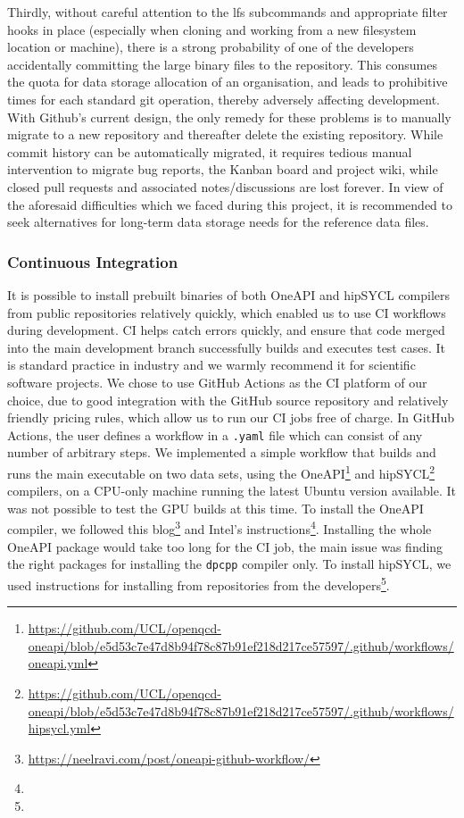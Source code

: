 \documentclass[../main]{subfiles}
\begin{document}
Thirdly, without careful attention to the lfs subcommands and appropriate filter hooks in place (especially when cloning and working from a new filesystem location or machine), there is a strong probability of one of the developers accidentally committing the large binary files to the repository.
This consumes the quota for data storage allocation of an organisation, and leads to prohibitive times for each standard git operation, thereby adversely affecting development.
With Github's current design, the only remedy for these problems is to manually migrate to a new repository and thereafter delete the existing repository.
While commit history can be automatically migrated, it requires tedious manual intervention to migrate bug reports, the Kanban board and project wiki, while closed pull requests and associated notes/discussions are lost forever.
In view of the aforesaid difficulties which we faced during this project, it is recommended to seek alternatives for long-term data storage needs for the reference data files.



\subsubsection{Continuous Integration}

It is possible to install prebuilt binaries of both OneAPI and hipSYCL compilers from public repositories relatively quickly, which enabled us to use CI workflows during development.
CI helps catch errors quickly, and ensure that code merged into the main development branch successfully builds and executes test cases.
It is standard practice in industry and we warmly recommend it for scientific software projects.
We chose to use GitHub Actions as the CI platform of our choice, due to good integration with the GitHub source repository and relatively friendly pricing rules, which allow us to run our CI jobs free of charge.
In GitHub Actions, the user defines a workflow in a \verb #.yaml# file which can consist of any number of arbitrary steps.
We implemented a simple workflow that builds and runs the main executable on two data sets, using the OneAPI\footnote{\url{https://github.com/UCL/openqcd-oneapi/blob/e5d53c7e47d8b94f78c87b91ef218d217ce57597/.github/workflows/oneapi.yml}} and hipSYCL\footnote{\url{https://github.com/UCL/openqcd-oneapi/blob/e5d53c7e47d8b94f78c87b91ef218d217ce57597/.github/workflows/hipsycl.yml}} compilers, on a CPU-only machine running the latest Ubuntu version available.
It was not possible to test the GPU builds at this time.
To install the OneAPI compiler, we followed this blog\footnote{\url{https://neelravi.com/post/oneapi-github-workflow/}} and Intel's instructions\footnote{\oneapiaptinstall}.
Installing the whole OneAPI package would take too long for the CI job, the main issue was finding the right packages for installing the \verb #dpcpp# compiler only.
To install hipSYCL, we used instructions for installing from repositories from the developers\footnote{\hipsyclinstallfromrepos}.
\end{document}

